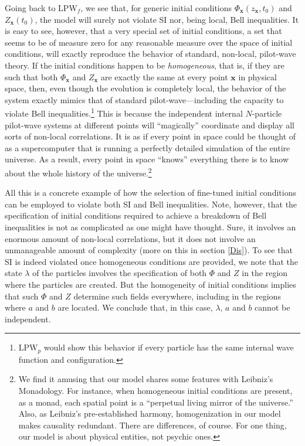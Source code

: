 \documentclass[letterpaper,12pt]{article}
\begin{document}
Going back to $\text{LPW}_f$, we see that, for generic initial conditions $\Phi_\mathbf{x}(z_{\mathbf{x}},t_0)$ and $Z_\mathbf{x}(t_0)$, the model will surely not violate SI nor, being local, Bell inequalities. It is easy to see, however, that a very special set of initial conditions, a set that seems to be of measure zero for any reasonable measure over the space of initial conditions, will exactly reproduce the behavior of standard, non-local, pilot-wave theory. If the initial conditions happen to be \emph{homogeneous}, that is, if they are such that both $\Phi_{\mathbf{x}}$ and $Z_{\mathbf{x}}$ are exactly the same at every point $ \mathbf{x} $ in physical space, then, even though the evolution is completely local, the behavior of the system exactly mimics that of standard pilot-wave---including the capacity to violate Bell inequalities.\footnote{$\text{LPW}_p$ would show this behavior if every particle has the same internal wave function and configuration.} This is because the independent internal $N$-particle pilot-wave systems at different points will ``magically'' coordinate and display all sorts of non-local correlations. It is as if every point in space could be thought of as a supercomputer that is running a perfectly detailed simulation of the entire universe. As a result, every point in space ``knows'' everything there is to know about the whole history of the universe.\footnote{We find it amusing that our model shares some features with Leibniz's Monadology. For instance, when homogeneous initial conditions are present, as a monad, each spatial point is a ``perpetual living mirror of the universe.'' Also, as Leibniz's pre-established harmony, homogenization in our model makes causality redundant. There are differences, of course. For one thing, our model is about physical entities, not psychic ones.}

All this is a concrete example of how the selection of fine-tuned initial conditions can be employed to violate both SI and Bell inequalities. Note, however, that the specification of initial conditions required to achieve a breakdown of Bell inequalities is not as complicated as one might have thought. Sure, it involves an enormous amount of non-local correlations, but it does not involve an unmanageable amount of complexity (more on this in section \ref{Dis}). To see that SI is indeed violated once homogeneous conditions are provided, we note that the state $\lambda$ of the particles involves the specification of both $\Phi$ and $Z$ in the region where the particles are created. But the homogeneity of initial conditions implies that such $\Phi$ and $Z$ determine such fields everywhere, including in the regions where $a$ and $b$ are located. We conclude that, in this case, $\lambda$, $a$ and $b$ cannot be independent.
\end{document}
